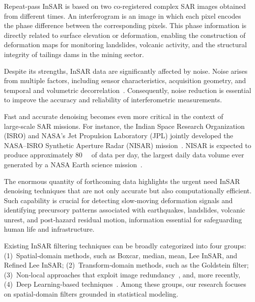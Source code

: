 \documentclass[remotesensing,article,submit,pdftex,moreauthors]{Definitions/mdpi}
\begin{document}
Repeat-pass InSAR is based on two co-registered complex SAR images obtained from different times.
An interferogram is an image in which each pixel encodes the phase difference between the corresponding pixels.
This phase information is directly related to surface elevation or deformation, enabling the construction of deformation maps for monitoring landslides, volcanic activity, and the structural integrity of tailings dams in the mining sector.

Despite its strengths, InSAR data are significantly affected by noise. 
Noise arises from multiple factors, including sensor characteristics, acquisition geometry, and temporal and volumetric decorrelation~\cite{EnhancedInterferometricPhaseNoiseFilteringoftheRefinedInSARFilter,Phase-BasedSimilarlyDecorrelatedPixelSelectionandPhase-Linking}. 
Consequently, noise reduction is essential to improve the accuracy and reliability of interferometric measurements. 

Fast and accurate denoising becomes even more critical in the context of large‑scale SAR missions. 
For instance, the Indian Space Research Organization (ISRO) and NASA’s Jet Propulsion Laboratory (JPL) jointly developed the NASA–ISRO Synthetic Aperture Radar (NISAR) mission~\cite{NISARmission}. 
NISAR is expected to produce approximately \qty{80}{\tera\byte} of data per day, the largest daily data volume ever generated by a NASA Earth science mission~\cite{rosen2023nisar}.

The enormous quantity of forthcoming data highlights the urgent need InSAR denoising techniques that are not only accurate but also computationally efficient. 
Such capability is crucial for detecting slow‑moving deformation signals and identifying precursory patterns associated with earthquakes, landslides, volcanic unrest, and post‑hazard residual motion, information essential for safeguarding human life and infrastructure.

Existing InSAR filtering techniques can be broadly categorized into four groups:
(1)~Spatial‑domain methods, such as Boxcar, median, mean, Lee InSAR, and Refined Lee InSAR;
(2)~Transform‑domain methods, such as the Goldstein filter;
(3)~Non‑local approaches that exploit image redundancy~\cite{ANonlocalInSARFilterforHighResolutionDEMGenerationfromTanDEMXInterferograms}, and, more recently,
(4)~Deep Learning-based techniques~\cite{DBPFNetaDoubleBranchParallelFusionNeuralNetworkMethodforLandSubsidenceSusceptibilityMappingwithInSARObservationData,IntegratingExplainableMachineLearningandLSTMwithMultipleFactorsforMechanismIdentificationandPredictionofLandDeformationintheNorthHenanPlain}.
Among these groups, our research focuses on spatial-domain filters grounded in statistical modeling. 
\end{document}
